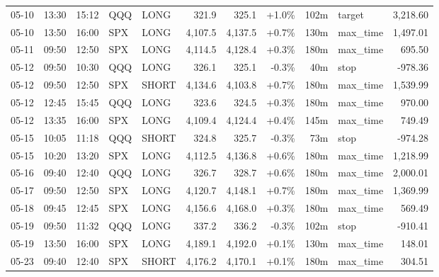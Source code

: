 \documentclass[11pt,a4paper,twoside]{article}
\begin{document}
\begin{center}
\begin{longtable}{>{\color{txtmain}}l l l l l r r r r >{\color{txtmain}}l r}
05-10 & 13:30 & 15:12 & QQQ & LONG & 321.9 & 325.1 & \textcolor{wingreen}{+1.0\%} & 102m & target & \textcolor{wingreen}{3,218.60} \\
05-10 & 13:50 & 16:00 & SPX & LONG & 4,107.5 & 4,137.5 & \textcolor{wingreen}{+0.7\%} & 130m & max\_time & \textcolor{wingreen}{1,497.01} \\
05-11 & 09:50 & 12:50 & SPX & LONG & 4,114.5 & 4,128.4 & \textcolor{wingreen}{+0.3\%} & 180m & max\_time & \textcolor{wingreen}{695.50} \\
05-12 & 09:50 & 10:30 & QQQ & LONG & 326.1 & 325.1 & \textcolor{lossred}{-0.3\%} & 40m & stop & \textcolor{lossred}{-978.36} \\
05-12 & 09:50 & 12:50 & SPX & SHORT & 4,134.6 & 4,103.8 & \textcolor{wingreen}{+0.7\%} & 180m & max\_time & \textcolor{wingreen}{1,539.99} \\
05-12 & 12:45 & 15:45 & QQQ & LONG & 323.6 & 324.5 & \textcolor{wingreen}{+0.3\%} & 180m & max\_time & \textcolor{wingreen}{970.00} \\
05-12 & 13:35 & 16:00 & SPX & LONG & 4,109.4 & 4,124.4 & \textcolor{wingreen}{+0.4\%} & 145m & max\_time & \textcolor{wingreen}{749.49} \\
05-15 & 10:05 & 11:18 & QQQ & SHORT & 324.8 & 325.7 & \textcolor{lossred}{-0.3\%} & 73m & stop & \textcolor{lossred}{-974.28} \\
05-15 & 10:20 & 13:20 & SPX & LONG & 4,112.5 & 4,136.8 & \textcolor{wingreen}{+0.6\%} & 180m & max\_time & \textcolor{wingreen}{1,218.99} \\
05-16 & 09:40 & 12:40 & QQQ & LONG & 326.7 & 328.7 & \textcolor{wingreen}{+0.6\%} & 180m & max\_time & \textcolor{wingreen}{2,000.01} \\
05-17 & 09:50 & 12:50 & SPX & LONG & 4,120.7 & 4,148.1 & \textcolor{wingreen}{+0.7\%} & 180m & max\_time & \textcolor{wingreen}{1,369.99} \\
05-18 & 09:45 & 12:45 & SPX & LONG & 4,156.6 & 4,168.0 & \textcolor{wingreen}{+0.3\%} & 180m & max\_time & \textcolor{wingreen}{569.49} \\
05-19 & 09:50 & 11:32 & QQQ & LONG & 337.2 & 336.2 & \textcolor{lossred}{-0.3\%} & 102m & stop & \textcolor{lossred}{-910.41} \\
05-19 & 13:50 & 16:00 & SPX & LONG & 4,189.1 & 4,192.0 & \textcolor{wingreen}{+0.1\%} & 130m & max\_time & \textcolor{wingreen}{148.01} \\
05-23 & 09:40 & 12:40 & SPX & SHORT & 4,176.2 & 4,170.1 & \textcolor{wingreen}{+0.1\%} & 180m & max\_time & \textcolor{wingreen}{304.51} \\

\end{longtable}
\end{center}
\end{document}
